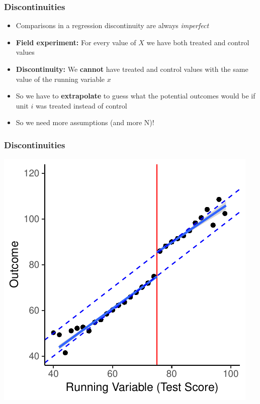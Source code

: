 \documentclass[xcolor=x11names,compress]{beamer}\usepackage[]{graphicx}\usepackage[]{color}
\makeatletter
\def\maxwidth{ %
  \ifdim\Gin@nat@width>\linewidth
    \linewidth
  \else
    \Gin@nat@width
  \fi
}
\newenvironment{knitrout}{}{} %
\renewcommand{\(}{\begin{columns}}
\renewcommand{\)}{\end{columns}}
\newcommand{\<}[1]{\begin{column}{#1}}
\renewcommand{\>}{\end{column}}
\makeatother
\begin{document}
\begin{frame}
\frametitle{Discontinuities}
\begin{itemize}
\item Comparisons in a regression discontinuity are always \textit{imperfect}
\pause
\item \textbf{Field experiment:} For every value of $X$ we have both treated and control values
\pause
\item \textbf{Discontinuity:} We \textbf{cannot} have treated and control values with the same value of the running variable $x$
\pause
\item So we have to \textbf{extrapolate} to guess what the potential outcomes would be if unit $i$ was treated instead of control
\pause
\item So we need more assumptions (and more N)!
\end{itemize}
\end{frame}

\begin{frame}
\frametitle{Discontinuities}
\begin{knitrout}
\color{fgcolor}
\includegraphics[width=\maxwidth]{figure/chart2_binned-1} 

\end{knitrout}
\end{frame}
\end{document}
